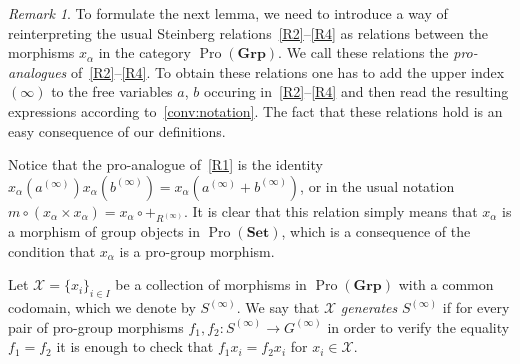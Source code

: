 \documentclass[oneside, 11pt]{amsart}
\numberwithin{equation}{section}
\theoremstyle{definition}
\theoremstyle{remark}
\newtheorem{rem}[lemma]{Remark}
\DeclareMathOperator{\Pro}{Pro}
\newcommand{\Set}{\mathbf{Set}}
\newcommand{\Group}{\mathbf{Grp}}
\begin{document}
\begin{rem}
 To formulate the next lemma, we need to introduce a way of reinterpreting the usual Steinberg relations~\eqref{R2}--\eqref{R4} as relations between the morphisms $x_\alpha$ in the category $\Pro(\Group)$. We call these relations the {\it pro-analogues} of~\eqref{R2}--\eqref{R4}. To obtain these relations one has to add the upper index $(\infty)$ to the free variables $a$, $b$ occuring in~\eqref{R2}--\eqref{R4} and then read the resulting expressions according to~\cref{conv:notation}. The fact that these relations hold is an easy consequence of our definitions.
 
 Notice that the pro-analogue of~\eqref{R1} is the identity $x_\alpha(a^{(\infty)}) x_\alpha(b^{(\infty)}) = x_\alpha(a^{(\infty)} + b^{(\infty)})$, or in the usual notation $m \circ (x_\alpha \times x_\alpha) = x_\alpha \circ +_{R^{(\infty)}}$. It is clear that this relation simply means that $x_\alpha$ is a morphism of group objects in $\Pro(\Set)$, which is a consequence of the condition that $x_\alpha$ is a pro-group morphism.
\end{rem}

Let $\mathcal{X} = \{ x_i \}_{i \in I}$ be a collection of morphisms in $\Pro(\Group)$ with a common codomain, which we denote by $S^{(\infty)}$. We say that $\mathcal{X}$ {\it generates} $S^{(\infty)}$ if for every pair of pro-group morphisms $f_1, f_2 \colon S^{(\infty)} \to G^{(\infty)}$ in order to verify the equality $f_1 = f_2$ it is enough to check that $f_1 x_i = f_2 x_i$ for $x_i \in \mathcal{X}$. 
\end{document}
